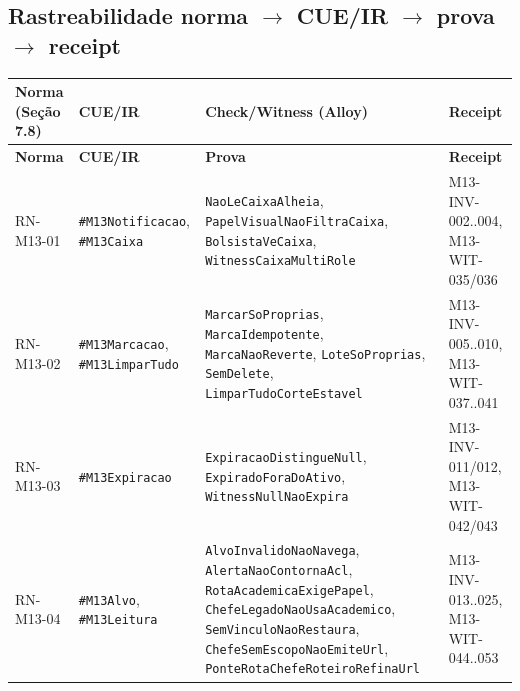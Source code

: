 \subsection*{Rastreabilidade norma $\rightarrow$ CUE/IR $\rightarrow$ prova $\rightarrow$ receipt}
\begingroup\scriptsize
\setlength{\tabcolsep}{3pt}
\begin{longtable}{>{\raggedright\arraybackslash}p{} >{\raggedright\arraybackslash}p{} >{\raggedright\arraybackslash}p{} >{\raggedright\arraybackslash}p{}}
\toprule
\textbf{Norma (Seção 7.8)} & \textbf{CUE/IR} & \textbf{Check/Witness (Alloy)} & \textbf{Receipt} \\
\midrule
\endfirsthead
\toprule
\textbf{Norma} & \textbf{CUE/IR} & \textbf{Prova} & \textbf{Receipt} \\
\midrule
\endhead
\bottomrule
\endfoot
RN-M13-01 & \texttt{\#M13Notificacao}, \texttt{\#M13Caixa} & \texttt{NaoLeCaixaAlheia}, \newline \texttt{PapelVisualNaoFiltraCaixa}, \newline \texttt{BolsistaVeCaixa}, \newline \texttt{WitnessCaixaMultiRole} & M13-INV-002..004, M13-WIT-035/036 \\
RN-M13-02 & \texttt{\#M13Marcacao}, \texttt{\#M13LimparTudo} & \texttt{MarcarSoProprias}, \newline \texttt{MarcaIdempotente}, \newline \texttt{MarcaNaoReverte}, \newline \texttt{LoteSoProprias}, \newline \texttt{SemDelete}, \newline \texttt{LimparTudoCorteEstavel} & M13-INV-005..010, M13-WIT-037..041 \\
RN-M13-03 & \texttt{\#M13Expiracao} & \texttt{ExpiracaoDistingueNull}, \newline \texttt{ExpiradoForaDoAtivo}, \newline \texttt{WitnessNullNaoExpira} & M13-INV-011/012, M13-WIT-042/043 \\
RN-M13-04 & \texttt{\#M13Alvo}, \texttt{\#M13Leitura} & \texttt{AlvoInvalidoNaoNavega}, \newline \texttt{AlertaNaoContornaAcl}, \newline \texttt{RotaAcademicaExigePapel}, \newline \texttt{ChefeLegadoNaoUsaAcademico}, \newline \texttt{SemVinculoNaoRestaura}, \newline \texttt{ChefeSemEscopoNaoEmiteUrl}, \newline \texttt{PonteRotaChefeRoteiroRefinaUrl} & M13-INV-013..025, \newline M13-WIT-044..053 \\

\end{longtable}
